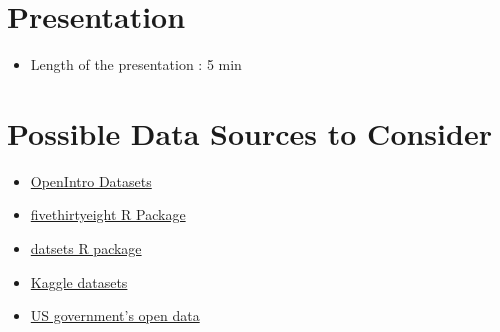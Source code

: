 \documentclass[12pt]{article}
\begin{document}
\section*{Presentation}
\begin{itemize}
    \item Length of the presentation : 5 min 

\end{itemize}



\section*{Possible Data Sources to Consider}
\begin{itemize}
    \item \href{https://www.openintro.org/data/}{OpenIntro Datasets}
    \item \href{https://cran.r-project.org/web/packages/fivethirtyeight/vignettes/fivethirtyeight.html}{fivethirtyeight 
    R Package}
    \item \href{https://stat.ethz.ch/R-manual/R-devel/library/datasets/html/00Index.html}{datsets R package}
    \item \href{https://www.kaggle.com/datasets}{Kaggle datasets}
    \item \href{https://data.gov/}{US government's open data}
\end{itemize}

\end{document}
